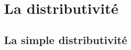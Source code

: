 \documentclass[a4paper,dvipsnames]{article}
\begin{document}
\section{La distributivité}

\subsection{La simple distributivité}

\end{document}
